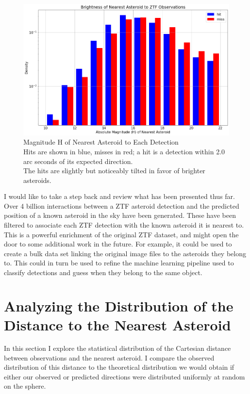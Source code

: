 \begin{figure}[hbt!]
\begin{center}
\includegraphics[width=1.0\textwidth]{../figs/ztf/nearest_ast_brightness.png}
\caption[Magnitude H of Nearest Asteroid to Each Detection]
{Magnitude H of Nearest Asteroid to Each Detection\\
Hits are shown in blue, misses in red; a hit is a detection within 2.0 arc seconds of its expected direction.\\
The hits are slightly but noticeably tilted in favor of brighter asteroids.}
\end{center}
\end{figure}

I would like to take a step back and review what has been presented thus far.
Over 4 billion interactions between a ZTF asteroid detection and the predicted position of a known asteroid in the sky have been generated.
These have been filtered to associate each ZTF detection with the known asteroid it is nearest to.
This is a powerful enrichment of the original ZTF dataset, and might open the door to some additional work in the future.
For example, it could be used to create a bulk data set linking the original image files to the asteroids they belong to.
This could in turn be used to refine the machine learning pipeline used to classify detections and guess when they belong to the same object.

\section{Analyzing the Distribution of the Distance to the Nearest Asteroid}
\label{section_nearest_ast_distribution}
In this section I explore the statistical distribution of the Cartesian distance between observations and the nearest asteroid.
I compare the observed distribution of this distance to the theoretical distribution we would obtain 
if either our observed or predicted directions were distributed uniformly at random on the sphere.

